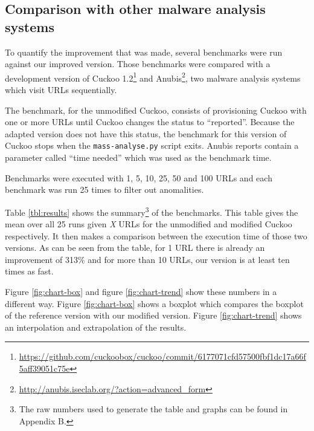 \pagebreak

\restoregeometry
{}
\setcounter{page}{\thesavepage}

\subsection{Comparison with other malware analysis systems}

To quantify the improvement that was made, several benchmarks were run against our improved version. Those benchmarks were compared with a development version of Cuckoo 1.2\footnote{\url{https://github.com/cuckoobox/cuckoo/commit/6177071cfd57500fbf1dc17a66f5aff39051c75e}} and Anubis\footnote{\url{http://anubis.iseclab.org/?action=advanced\_form}}, two malware analysis systems which visit URLs sequentially.%

The benchmark, for the unmodified Cuckoo, consists of provisioning Cuckoo with one or more URLs until Cuckoo changes the status to ``reported''. Because the adapted version does not have this status, the benchmark for this version of Cuckoo stops when the \texttt{mass-analyse.py} script exits. Anubis reports contain a parameter called ``time needed'' which was used as the benchmark time.

Benchmarks were executed with 1, 5, 10, 25, 50 and 100 URLs and each benchmark was run 25 times to filter out anomalities.

Table \ref{tbl:results} shows the summary\footnote{The raw numbers used to generate the table and graphs can be found in Appendix B.} of the benchmarks. This table gives the mean over all 25 runs given \textit{X} URLs for the unmodified and modified Cuckoo respectively. It then makes a comparison between the execution time of those two versions. As can be seen from the table, for 1 URL there is already an improvement of 313\% and for more than 10 URLs, our version is at least ten times as fast.

Figure \ref{fig:chart-box} and figure \ref{fig:chart-trend} show these numbers in a different way. Figure \ref{fig:chart-box} shows a boxplot which compares the boxplot of the reference version with our modified version. Figure \ref{fig:chart-trend} shows an interpolation and extrapolation of the results.


